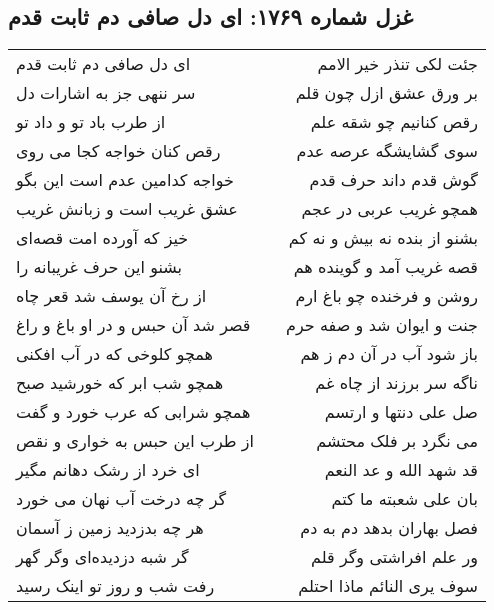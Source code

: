 \begin{center}
\section*{غزل شماره ۱۷۶۹: ای دل صافی دم ثابت قدم}
\label{sec:1769}
\begin{longtable}{l p{0.5cm} r}
ای دل صافی دم ثابت قدم
&&
جئت لکی تنذر خیر الامم
\\
سر ننهی جز به اشارات دل
&&
بر ورق عشق ازل چون قلم
\\
از طرب باد تو و داد تو
&&
رقص کنانیم چو شقه علم
\\
رقص کنان خواجه کجا می روی
&&
سوی گشایشگه عرصه عدم
\\
خواجه کدامین عدم است این بگو
&&
گوش قدم داند حرف قدم
\\
عشق غریب است و زبانش غریب
&&
همچو غریب عربی در عجم
\\
خیز که آورده امت قصه‌ای
&&
بشنو از بنده نه بیش و نه کم
\\
بشنو این حرف غریبانه را
&&
قصه غریب آمد و گوینده هم
\\
از رخ آن یوسف شد قعر چاه
&&
روشن و فرخنده چو باغ ارم
\\
قصر شد آن حبس و در او باغ و راغ
&&
جنت و ایوان شد و صفه حرم
\\
همچو کلوخی که در آب افکنی
&&
باز شود آب در آن دم ز هم
\\
همچو شب ابر که خورشید صبح
&&
ناگه سر برزند از چاه غم
\\
همچو شرابی که عرب خورد و گفت
&&
صل علی دنتها و ارتسم
\\
از طرب این حبس به خواری و نقص
&&
می نگرد بر فلک محتشم
\\
ای خرد از رشک دهانم مگیر
&&
قد شهد الله و عد النعم
\\
گر چه درخت آب نهان می خورد
&&
بان علی شعبته ما کتم
\\
هر چه بدزدید زمین ز آسمان
&&
فصل بهاران بدهد دم به دم
\\
گر شبه دزدیده‌ای وگر گهر
&&
ور علم افراشتی وگر قلم
\\
رفت شب و روز تو اینک رسید
&&
سوف یری النائم ماذا احتلم
\\
\end{longtable}
\end{center}
